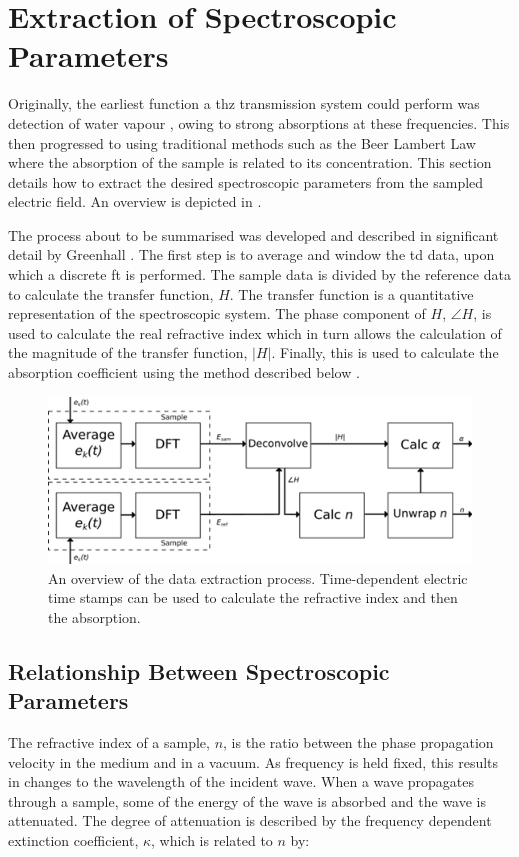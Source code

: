 \section{Extraction of Spectroscopic Parameters}
Originally, the earliest function a \acrshort{thz} transmission system could perform was detection of water vapour \cite{vanExt1989}, owing to strong absorptions at these frequencies. This then progressed to using traditional methods such as the Beer Lambert Law \cite{Kasap2006} where the absorption of the sample is related to its concentration. This section details how to extract the desired spectroscopic parameters from the sampled electric field. An overview is depicted in . 

The process about to be summarised was developed and described in significant detail by Greenhall \cite{Greenall2017}. The first step is to average and window the \acrshort{td} data, upon which a discrete \acrfull{ft} is performed. The sample data is divided by the reference data to calculate the transfer function, \(H\). The transfer function is a quantitative representation of the spectroscopic system. The phase component of \(H\), \(\angle H\), is used to calculate the real refractive index which in turn allows the calculation of the magnitude of the transfer function, \(|H|\). Finally, this is used to calculate the absorption coefficient using the method described below \cite{Greenall2017}.

\begin{figure}[b]
    \centering
    \includegraphics{Figures/Misc/Theory/SignaltoParamFlow.png}
    \captionsetup{font = footnotesize, justification = centering}
    \caption[An Overview of the Data Extraction Process]{An overview of the data extraction process. Time-dependent electric time stamps can be used to calculate the refractive index and then the absorption.}
    \label{fig:dataextraction}
\end{figure}

\subsection{Relationship Between Spectroscopic Parameters}
The refractive index of a sample, \(n\), is the ratio between the phase propagation velocity in the medium and in a vacuum. As frequency is held fixed, this results in changes to the wavelength of the incident wave. When a wave propagates through a sample, some of the energy of the wave is absorbed and the wave is attenuated. The degree of attenuation is described by the frequency dependent extinction coefficient, \(\kappa\), which is related to \(n\) by:

